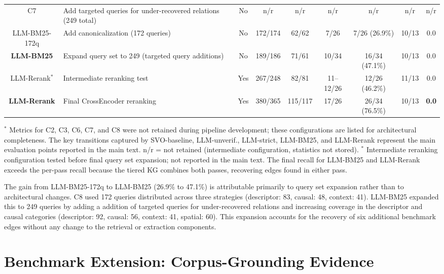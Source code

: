 \documentclass[10pt]{article}
\begin{document}
\begin{table}[htb]
\begin{tabular}{clccccccc}
C7
  & Add targeted queries for under-recovered relations (249 total)
  & No & n/r & n/r & n/r & n/r & n/r & n/r \\
LLM-BM25-172q
  & Add canonicalization (172 queries)
  & No & 172/174 & 62/62 & 7/26 & 7/26 (26.9\%) & 10/13 & 0.0 \\
\textbf{LLM-BM25}
  & Expand query set to 249 (targeted query additions)
  & No & 189/186 & 71/61 & 10/34 & 16/34 (47.1\%) & 10/13 & 0.0 \\
LLM-Rerank$^*$
  & Intermediate reranking test
  & Yes & 267/248 & 82/81 & 11--12/26 & 12/26 (46.2\%) & 11/13 & 0.0 \\
\textbf{LLM-Rerank}
  & Final CrossEncoder reranking
  & Yes & 380/365 & 115/117 & 17/26 & 26/34 (76.5\%) & 10/13 & \textbf{0.0} \\
\bottomrule
\end{tabular}
\noindent\small$^*$ Metrics for C2, C3, C6, C7, and
C8 were not retained during pipeline development;
these configurations are listed for architectural
completeness. The key transitions captured by SVO-baseline,
LLM-unverif., LLM-strict, LLM-BM25, and LLM-Rerank represent the main evaluation
points reported in the main text.
\medskip
\noindent\small
n/r = not retained (intermediate configuration,
statistics not stored).
$^*$ Intermediate reranking configuration tested
before final query set expansion; not reported in
the main text.
The final recall for LLM-BM25 and LLM-Rerank exceeds the
per-pass recall because the tiered KG combines
both passes, recovering edges found in either pass.
\end{table}

The gain from LLM-BM25-172q to LLM-BM25 (26.9\% to 47.1\%) is
attributable primarily to query set expansion
rather than to architectural changes.
C8 used 172 queries distributed across three
strategies (descriptor: 83, causal: 48,
context: 41).
LLM-BM25 expanded this to 249 queries by adding a
addition of targeted queries for under-recovered relations and increasing coverage
in the descriptor and causal categories
(descriptor: 92, causal: 56, context: 41,
spatial: 60).
This expansion accounts for the recovery of six
additional benchmark edges without any change to
the retrieval or extraction components.

\section{Benchmark Extension: Corpus-Grounding Evidence}
\label{app:bench-extension}
\end{document}
